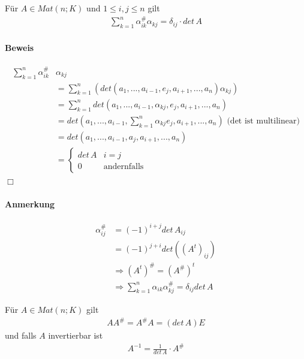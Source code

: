 \documentclass[11pt]{report}
\begin{document}
\begin{satz}
\label{satz623}
Für $A \in Mat(n;K)$ und $1 \leq i,j \leq n$ gilt
\begin{align}
\sum_{k=1}^{n} \alpha_{ik}^{\#} \alpha_{kj} = \delta_{ij}\cdot det \, A
\end{align}
\end{satz}

\paragraph{Beweis}
\begin{align}
\sum_{k=1}^{n} \alpha_{ik}^{\#} &\alpha_{kj} \\
&= \sum_{k=1}^{n} (det(a_1, ..., a_{i-1}, e_j, a_{i+1}, ..., a_n)\alpha_{kj}) \\
&= \sum_{k=1}^{n}det(a_1, ..., a_{i-1}, \alpha_{kj}, e_j, a_{i+1}, ..., a_n) \\
&= det(a_1, ..., a_{i-1}, \sum_{k=1}^{n} \alpha_{kj} e_j, a_{i+1}, ..., a_n) \text{ (det ist multilinear)} \\
&= det(a_1, ..., a_{i-1}, a_j, a_{i+1}, ..., a_n) \\
&= \left\{ \begin{matrix} det \, A & i=j \\ 0 & \text{andernfalls} \end{matrix} \right.
\end{align}
\hspace*{1cm} \hfill $\Box$

\paragraph{Anmerkung}
\begin{align}
\alpha_{ij}^{\#} &= (-1)^{i+j} det \, A_{ij} \\
&= (-1)^{j+i} det((A^{t})_{ij}) \\
&\Rightarrow (A^t)^{\#} = (A^{\#})^t \\
&\Rightarrow \sum_{k=1}^{n} \alpha_{ik} \alpha_{kj}^{\#} = \delta_{ij} det \, A
\end{align}

\begin{korollar}
\label{korollar624}
Für $A \in Mat(n;K)$ gilt 
\begin{align}
AA^{\#} = A^{\#}A = (det \, A) E
\end{align}
und falls $A$ invertierbar ist
\begin{align}
A^{-1} = \frac{1}{det \, A} \cdot A^{\#}
\end{align}
\end{korollar}
\end{document}
